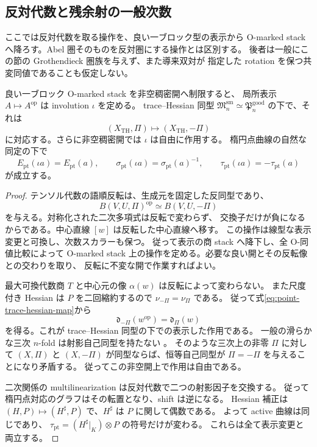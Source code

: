 \subsection{反対代数と残余射の一般次数}

ここでは反対代数を取る操作を、良い一ブロック型の表示から
O-marked stack へ降ろす。Abel 圏そのものを反対圏にする操作とは区別する。
後者は一般にこの節の Grothendieck 圏族を与えず、また導来双対が
指定した rotation を保つ共変同値であることも仮定しない。

\begin{proposition}
\label{prop:nfm-opposite-involution}
良い一ブロック O-marked stack を非空稠密開へ制限すると、
局所表示 $A\mapsto A^{\mathrm{op}}$ は involution $\iota$ を定める。
trace--Hessian 同型
$\mathfrak M_n^{\mathrm{sm}}\simeq\mathfrak P_n^{\mathrm{good}}$
の下で、それは
\[
 (X_{\mathrm{TH}},\Pi)\longmapsto(X_{\mathrm{TH}},-\Pi)
\]
に対応する。さらに非空稠密開では $\iota$ は自由に作用する。
楕円点曲線の自然な同定の下で
\[
 E_{\mathrm{pt}}(\iota a)=E_{\mathrm{pt}}(a),\qquad
 \sigma_{\mathrm{pt}}(\iota a)=\sigma_{\mathrm{pt}}(a)^{-1},\qquad
 \tau_{\mathrm{pt}}(\iota a)=-\tau_{\mathrm{pt}}(a)
\]
が成立する。
\end{proposition}

\begin{proof}
テンソル代数の語順反転は、生成元を固定した反同型であり、
\[
 B(V,U,\Pi)^{\mathrm{op}}\simeq B(V,U,-\Pi)
\]
を与える。対称化された二次多項式は反転で変わらず、
交換子だけが負になるからである。中心直線 $[w]$ は反転した中心直線へ移す。
この操作は線型な表示変更と可換し、次数スカラーも保つ。
従って表示の商 stack へ降下し、全 O-同値比較によって
O-marked stack 上の操作を定める。必要な良い開とその反転像との交わりを取り、
反転に不変な開で作業すればよい。

最大可換代数商 $T$ と中心元の像 $\alpha(w)$ は反転によって変わらない。
また尺度付き Hessian は $P$ を二回縮約するので
$\nu_{-\Pi}=\nu_\Pi$ である。
従って式\eqref{eq:point-trace-hessian-map}から
\[
 \mathfrak d_{-\Pi}(w^{\mathrm{op}})=\mathfrak d_\Pi(w)
\]
を得る。これが trace--Hessian 同型の下での表示した作用である。
一般の滑らかな三次 $n$-fold は射影自己同型を持たない
\cite[Theorem~1.5 and the preceding paragraph]{NFMPoonenAutomorphisms}。
そのような三次上の非零 $\Pi$ に対して
$(X,\Pi)$ と $(X,-\Pi)$ が同型ならば、恒等自己同型が
$\Pi=-\Pi$ を与えることになり矛盾する。
従ってこの非空開上で作用は自由である。

二次関係の multilinearization は反対代数で二つの射影因子を交換する。
従って楕円点対応のグラフはその転置となり、shift は逆になる。
Hessian 補正は $(H,P)\mapsto(H^\sharp,P)$ で、$H^\sharp$ は $P$ に関して偶数である。
よって active 曲線は同じであり、
$\tau_{\mathrm{pt}}=(H^\sharp|_K)\otimes P$ の符号だけが変わる。
これらは全て表示変更と両立する。
\end{proof}

